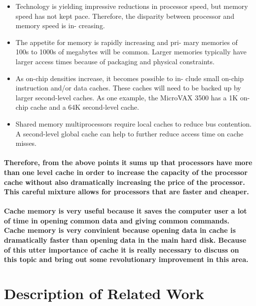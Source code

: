 \documentclass{article}
\begin{document}
\begin{itemize}

    \item Technology is yielding impressive reductions in processor
    speed, but memory speed has not kept pace. Therefore,
    the disparity between processor and memory speed is in-
    creasing.

    \item The appetite for memory is rapidly increasing and pri-
    mary memories of 100s to 1000s of megabytes will be
    common. Larger memories typically have larger access
    times because of packaging and physical constraints.

    \item As on-chip densities increase, it becomes possible to in-
    clude small on-chip instruction and/or data caches. These caches will need to be backed up by larger
    second-level caches. As one example, the MicroVAX 3500
    has a 1K on-chip cache and a 64K second-level cache.

    \item Shared memory multiprocessors require local caches to
    reduce bus contention. A second-level global cache can
    help to further reduce access time on cache misses.
    
\end{itemize}

\paragraph{Therefore, from the above points it sums up that processors have more than
 one level cache in order to increase the capacity of the processor cache without also
 dramatically increasing the price of the processor. This careful mixture allows for 
 processors that are faster and cheaper. 
}

\paragraph{Cache memory is very useful because it saves the computer user a lot of time in 
    opening common data and giving common commands. Cache memory is very convinient 
    because opening data in cache is dramatically faster than opening data in the main 
    hard disk. Because of this utter importance of cache it is really necessary to discuss 
    on this topic and bring out some revolutionary improvement in this area.
}

\section{Description of Related Work}
\end{document}
